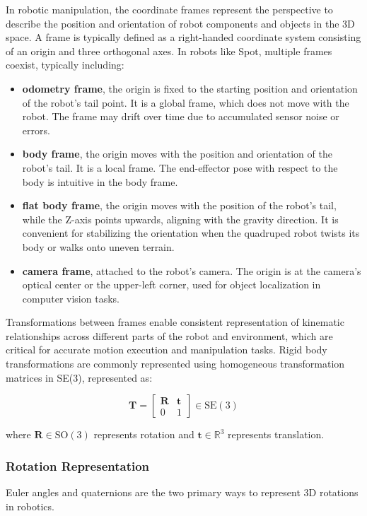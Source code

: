 \documentclass[english,12pt,a4paper,pdftex,elec,utf8]{aaltothesis}
\begin{document}
In robotic manipulation, the coordinate frames represent the perspective to describe the position and orientation of robot components and objects in the 3D space. A frame is typically defined as a right-handed coordinate system consisting of an origin and three orthogonal axes. In robots like Spot, multiple frames coexist, typically including: 
\begin{itemize}
    \item \textbf{odometry frame}, the origin is fixed to the starting position and orientation of the robot's tail point. It is a global frame, which does not move with the robot. The frame may drift over time due to accumulated sensor noise or errors.
    \item \textbf{body frame}, the origin moves with the position and orientation of the robot's tail. It is a local frame. The end-effector pose with respect to the body is intuitive in the body frame. 
    \item \textbf{flat body frame}, the origin moves with the position of the robot's tail, while the Z-axis points upwards, aligning with the gravity direction. It is convenient for stabilizing the orientation when the quadruped robot twists its body or walks onto uneven terrain. 
    \item \textbf{camera frame}, attached to the robot's camera. The origin is at the camera's optical center or the upper-left corner, used for object localization in computer vision tasks.
\end{itemize}

Transformations between frames enable consistent representation of kinematic relationships across different parts of the robot and environment, which are critical for accurate motion execution and manipulation tasks.
Rigid body transformations are commonly represented using homogeneous transformation matrices in SE(3), represented as:

\begin{equation}
\mathbf{T} =
\begin{bmatrix}
\mathbf{R} & \mathbf{t} \\
0 & 1
\end{bmatrix} \in \mathrm{SE}(3)
\end{equation}

where $\mathbf{R}\in \mathrm{SO}(3)$ represents rotation and $\mathbf{t}\in \mathbb{R}^3$ represents translation. 


\subsubsection{Rotation Representation}
Euler angles and quaternions are the two primary ways to represent 3D rotations in robotics. 
\end{document}
